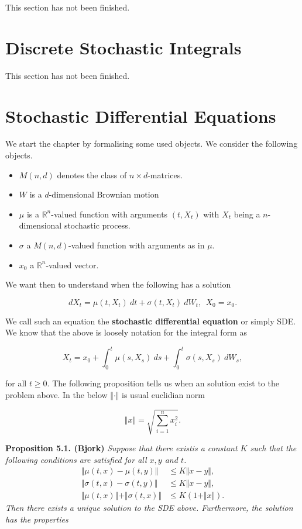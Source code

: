 \documentclass[a4paper,12pt,openany]{book}
\providecommand{\tightlist}{%
 \setlength{\itemsep}{0pt}\setlength{\parskip}{0pt}}
\begin{document}
This section has not been finished.

\hypertarget{discrete-stochastic-integrals}{%
\section{Discrete Stochastic Integrals}\label{discrete-stochastic-integrals}}

This section has not been finished.

\hypertarget{stochastic-differential-equations}{%
\section{Stochastic Differential Equations}\label{stochastic-differential-equations}}

We start the chapter by formalising some used objects. We consider the following objects.

\begin{itemize}
\tightlist
\item
  \(M(n,d)\) denotes the class of \(n\times d\)-matrices.
\item
  \(W\) is a \(d\)-dimensional Brownian motion
\item
  \(\mu\) is a \(\mathbb{R}^n\)-valued function with arguments \((t,X_t)\) with \(X_t\) being a \(n\)-dimensional stochastic process.
\item
  \(\sigma\) a \(M(n,d)\)-valued function with arguments as in \(\mu\).
\item
  \(x_0\) a \(\mathbb{R}^n\)-valued vector.
\end{itemize}

We want then to understand when the following has a solution

\[
dX_t=\mu(t,X_t)\ dt + \sigma(t,X_t)\ dW_t,\ \ X_0=x_0.\tag{5.1/2}
\]

We call such an equation the \textbf{stochastic differential equation} or simply SDE. We know that the above is loosely notation for the integral form as

\[
X_t=x_0+\int_0^t\mu(s,X_s)\ ds +\int_0^t\sigma(s,X_s)\ dW_s,\tag{5.3}
\]

for all \(t\ge 0\). The following proposition tells us when an solution exist to the problem above. In the below \(\Vert \cdot \Vert\) is usual euclidian norm

\[
\Vert x\Vert=\sqrt{\sum_{i=1}^nx_i^2}.
\]

\textbf{Proposition 5.1. (Bjork)} \emph{Suppose that there existis a constant \(K\) such that the following conditions are satisfied for all \(x,y\) and \(t\).}
\begin{align*}
\Vert \mu(t,x) - \mu(t,y) \Vert &\le K\Vert x-y\Vert,\tag{5.6}\\
\Vert \sigma(t,x) - \sigma(t,y) \Vert &\le K\Vert x-y\Vert,\tag{5.7}\\
\Vert \mu(t,x) \Vert +\Vert \sigma(t,x) \Vert&\le K(1+\Vert x\Vert).\tag{5.8}
\end{align*}
\emph{Then there exists a unique solution to the SDE above. Furthermore, the solution has the properties}
\end{document}
